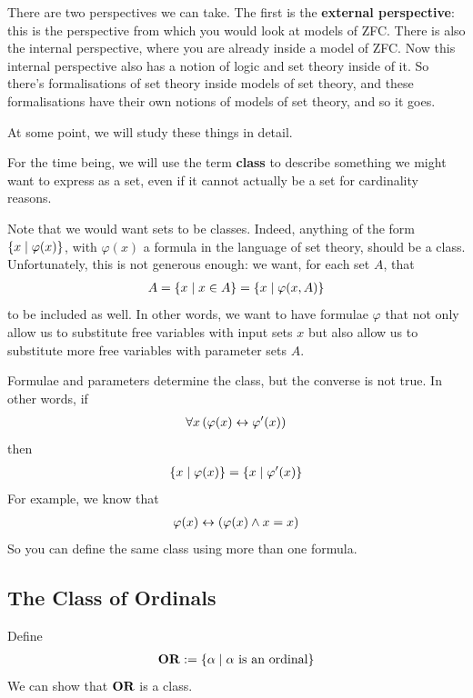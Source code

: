 There are two perspectives we can take. The first is the \textbf{external perspective}: this is the perspective from which you would look at models of ZFC. There is also the internal perspective, where you are already inside a model of ZFC. Now this internal perspective also has a notion of logic and set theory inside of it. So there's formalisations of set theory inside models of set theory, and these formalisations have their own notions of models of set theory, and so it goes.

At some point, we will study these things in detail.

For the time being, we will use the term \textbf{class} to describe something we might want to express as a set, even if it cannot actually be a set for cardinality reasons.

Note that we would want sets to be classes. Indeed, anything of the form $\left\{ x \; \middle\vert \; \varphi(x) \right\}$, with $\varphi(x)$ a formula in the language of set theory, should be a class. Unfortunately, this is not generous enough: we want, for each set $A$, that
\begin{align*}
    A = \left\{ x \; \middle\vert \; x \in A \right\} = \left\{ x \; \middle\vert \; \varphi\!\left( x, A \right) \right\}
\end{align*}
to be included as well. In other words, we want to have formulae $\varphi$ that not only allow us to substitute free variables with input sets $x$ but also allow us to substitute more free variables with parameter sets $A$.

Formulae and parameters determine the class, but the converse is not true. In other words, if
\begin{align*}
    \forall x \left( \varphi(x) \leftrightarrow \varphi'(x) \right)
\end{align*}
then
\begin{align*}
    \left\{ x \; \middle\vert \; \varphi(x) \right\} = \left\{ x \; \middle\vert \; \varphi'(x) \right\}
\end{align*}
For example, we know that
\begin{align*}
    \varphi(x) \leftrightarrow \left( \varphi(x) \land x = x \right)
\end{align*}
So you can define the same class using more than one formula.

\subsection{The Class of Ordinals}

\begin{boxdefinition}
    Define
    \begin{align*}
        \mathbf{OR} := \left\{ \alpha \; \middle\vert \; \alpha \text{ is an ordinal} \right\}
    \end{align*}
    We can show that $\mathbf{OR}$ is a class.
\end{boxdefinition}

